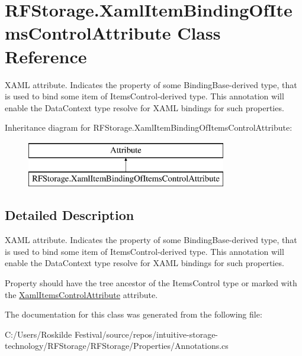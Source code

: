 \hypertarget{class_r_f_storage_1_1_xaml_item_binding_of_items_control_attribute}{}\section{R\+F\+Storage.\+Xaml\+Item\+Binding\+Of\+Items\+Control\+Attribute Class Reference}
\label{class_r_f_storage_1_1_xaml_item_binding_of_items_control_attribute}


X\+A\+ML attribute. Indicates the property of some {\ttfamily Binding\+Base}-\/derived type, that is used to bind some item of {\ttfamily Items\+Control}-\/derived type. This annotation will enable the {\ttfamily Data\+Context} type resolve for X\+A\+ML bindings for such properties.  


Inheritance diagram for R\+F\+Storage.\+Xaml\+Item\+Binding\+Of\+Items\+Control\+Attribute\+:\begin{figure}[H]
\begin{center}
\leavevmode
\includegraphics[height=2.000000cm]{class_r_f_storage_1_1_xaml_item_binding_of_items_control_attribute}
\end{center}
\end{figure}


\subsection{Detailed Description}
X\+A\+ML attribute. Indicates the property of some {\ttfamily Binding\+Base}-\/derived type, that is used to bind some item of {\ttfamily Items\+Control}-\/derived type. This annotation will enable the {\ttfamily Data\+Context} type resolve for X\+A\+ML bindings for such properties. 

Property should have the tree ancestor of the {\ttfamily Items\+Control} type or marked with the \mbox{\hyperlink{class_r_f_storage_1_1_xaml_items_control_attribute}{Xaml\+Items\+Control\+Attribute}} attribute. 

The documentation for this class was generated from the following file\+:\begin{DoxyCompactItemize}
\item 
C\+:/\+Users/\+Roskilde Festival/source/repos/intuitive-\/storage-\/technology/\+R\+F\+Storage/\+R\+F\+Storage/\+Properties/Annotations.\+cs\end{DoxyCompactItemize}
